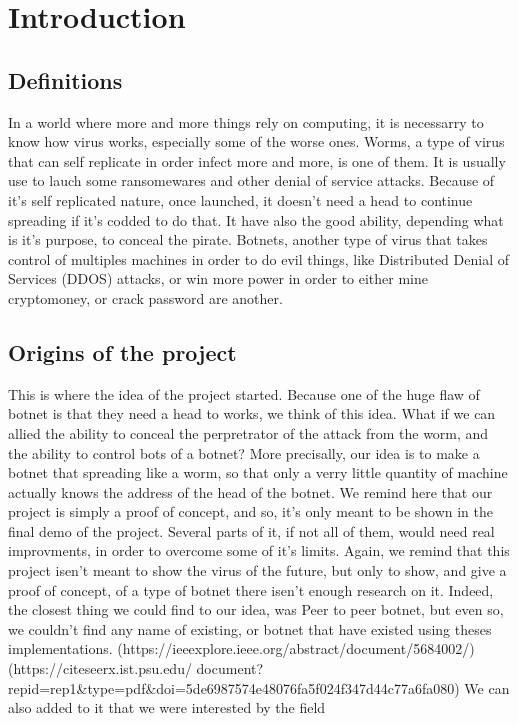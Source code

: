 \documentclass[../main.tex]{subfiles}
\begin{document}
    \newpage

	\chapter{Introduction}

    \section{Definitions}

    In a world where more and more things rely on computing, it is necessarry to know how virus works, especially some of the worse ones. 
    Worms, a type of virus that can self replicate in order infect more and more, is one of them.
    It is usually use to lauch some ransomewares and other denial of service attacks. 
    Because of it's self replicated nature, once launched, it doesn't need a head to continue spreading if it's codded to do that.
    It have also the good ability, depending what is it's purpose, to conceal the pirate.
    Botnets, another type of virus that takes control of multiples machines in order to do evil things, like Distributed Denial of Services (DDOS) attacks, or win more power in order to either mine cryptomoney, or crack password are another.

	\vspace{10pt}
    
    \section{Origins of the project}

    This is where the idea of the project started.
    Because one of the huge flaw of botnet is that they need a head to works, we think of this idea.
    What if we can allied the ability to conceal the perpretrator of the attack from the worm, and the ability to control bots of a botnet?
    More precisally, our idea is to make a botnet that spreading like a worm, so that only a verry little quantity of machine actually knows the address of the head of the botnet.
    We remind here that our project is simply a proof of concept, and so, it's only meant to be shown in the final demo of the project.
    Several parts of it, if not all of them, would need real improvments, in order to overcome some of it's limits.
    Again, we remind that this project isen't meant to show the virus of the future, but only to show, and give a proof of concept, of a type of botnet there isen't enough research on it.
    Indeed, the closest thing we could find to our idea, was Peer to peer botnet, but even so, we couldn't find any name of existing, or botnet that have existed using theses implementations.
    (https://ieeexplore.ieee.org/abstract/document/5684002/)
    (https://citeseerx.ist.psu.edu/
    document?repid=rep1\&type=pdf\&doi=5de6987574e48076fa5f024f347d44c77a6fa080)
    We can also added to it that we were interested by the field 
\end{document}
